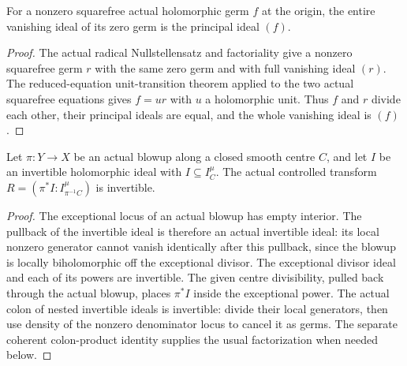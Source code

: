 \begin{lemma}
\label{hir:squarefree-equation-full-vanishing-ideal}
\leanok
For a nonzero squarefree actual holomorphic germ $f$ at the origin,
the entire vanishing ideal of its zero germ is the principal ideal $(f)$.
\end{lemma}
\begin{proof}
The actual radical Nullstellensatz and factoriality give a nonzero
squarefree germ $r$ with the same zero germ and with full vanishing ideal
$(r)$.  The reduced-equation unit-transition theorem applied to the two
actual squarefree equations gives $f=ur$ with $u$ a holomorphic unit.
Thus $f$ and $r$ divide each other, their principal ideals are equal,
and the whole vanishing ideal is $(f)$.
\end{proof}

\begin{lemma}
\label{hir:invertible-controlled-hypersurface-ideal}
\leanok
Let $\pi:Y\to X$ be an actual blowup along a closed smooth centre $C$,
and let $I$ be an invertible holomorphic ideal with
$I\subseteq I_C^\mu$.  The actual controlled transform
$R=(\pi^*I:I_{\pi^{-1}C}^{\mu})$ is invertible.
\end{lemma}
\begin{proof}
The exceptional locus of an actual blowup has empty interior.  The pullback
of the invertible ideal is therefore an actual invertible ideal: its local
nonzero generator cannot vanish identically after this pullback, since
the blowup is locally biholomorphic off the exceptional divisor.
The exceptional divisor ideal and each of its powers are invertible.
The given centre divisibility, pulled back through the actual blowup,
places $\pi^*I$ inside the exceptional power.  The actual colon of nested
invertible ideals is invertible: divide their local generators, then use
density of the nonzero denominator locus to cancel it as germs.
The separate coherent colon-product identity supplies the usual
factorization when needed below.
\end{proof}

